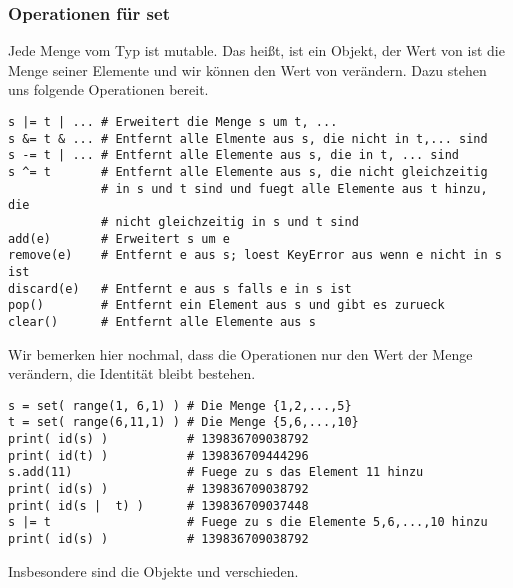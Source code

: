 \subsubsection{Operationen für set}
\label{section:std_data_types:mengen:operationen_fuer_set}
Jede Menge  vom Typ  ist mutable.
Das heißt,  ist ein Objekt, der Wert von  ist die Menge seiner Elemente und wir können den Wert von  verändern.
Dazu stehen uns folgende Operationen bereit.
\begin{lstlisting}
s |= t | ... # Erweitert die Menge s um t, ...
s &= t & ... # Entfernt alle Elmente aus s, die nicht in t,... sind
s -= t | ... # Entfernt alle Elemente aus s, die in t, ... sind
s ^= t       # Entfernt alle Elemente aus s, die nicht gleichzeitig
             # in s und t sind und fuegt alle Elemente aus t hinzu, die
             # nicht gleichzeitig in s und t sind
add(e)       # Erweitert s um e
remove(e)    # Entfernt e aus s; loest KeyError aus wenn e nicht in s ist
discard(e)   # Entfernt e aus s falls e in s ist
pop()        # Entfernt ein Element aus s und gibt es zurueck
clear()      # Entfernt alle Elemente aus s
\end{lstlisting}

Wir bemerken hier nochmal, dass die Operationen nur den Wert der Menge  ver\-än\-dern, die Identität  bleibt bestehen.
\begin{lstlisting}
s = set( range(1, 6,1) ) # Die Menge {1,2,...,5}
t = set( range(6,11,1) ) # Die Menge {5,6,...,10}
print( id(s) )           # 139836709038792
print( id(t) )           # 139836709444296
s.add(11)                # Fuege zu s das Element 11 hinzu
print( id(s) )           # 139836709038792
print( id(s |  t) )      # 139836709037448
s |= t                   # Fuege zu s die Elemente 5,6,...,10 hinzu
print( id(s) )           # 139836709038792
\end{lstlisting}
Insbesondere sind die Objekte  und  verschieden.
